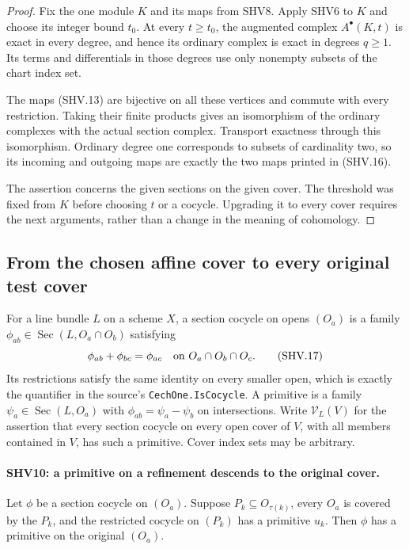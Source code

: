 \begin{proof}
Fix the one module $K$ and its maps from SHV8.  Apply SHV6 to
$K$ and choose its integer bound $t_0$.  At every $t\ge t_0$,
the augmented complex $A^\bullet(K,t)$ is exact in every
degree, and hence its ordinary complex is exact in degrees
$q\ge1$.  Its terms and differentials in those degrees use
only nonempty subsets of the chart index set.

The maps (SHV.13) are bijective on all these vertices and
commute with every restriction.  Taking their finite products
gives an isomorphism of the ordinary complexes with the
actual section complex.  Transport exactness through this
isomorphism.  Ordinary degree one corresponds to subsets of
cardinality two, so its incoming and outgoing maps are exactly
the two maps printed in (SHV.16).

The assertion concerns the given sections on the given cover.
The threshold was fixed from $K$ before choosing $t$ or a
cocycle.  Upgrading it to every cover requires the next
arguments, rather than a change in the meaning of cohomology.
\end{proof}

\subsection{From the chosen affine cover to every original test cover}

For a line bundle $L$ on a scheme $X$, a section cocycle on opens
$(O_a)$ is a family
$\phi_{ab}\in\operatorname{Sec}(L,O_a\cap O_b)$ satisfying
\[
                   \phi_{ab}+\phi_{bc}=\phi_{ac}
                   \quad\hbox{on }O_a\cap O_b\cap O_c.
                                                        \tag{SHV.17}
\]
Its restrictions satisfy the same identity on every smaller open,
which is exactly the quantifier in the source's
\texttt{CechOne.IsCocycle}.  A primitive is a family
$\psi_a\in\operatorname{Sec}(L,O_a)$ with
$\phi_{ab}=\psi_a-\psi_b$ on intersections.
Write $\mathcal V_L(V)$ for the assertion that every section cocycle
on every open cover of $V$, with all members contained in $V$,
has such a primitive.  Cover index sets may be arbitrary.

\paragraph{SHV10: a primitive on a refinement descends to the original cover.}
\label{claim:SHV10}
Let $\phi$ be a section cocycle on $(O_a)$.  Suppose
$P_k\subseteq O_{\tau(k)}$, every $O_a$ is covered by the
$P_k$, and the restricted cocycle on $(P_k)$ has a primitive
$u_k$.  Then $\phi$ has a primitive on the original $(O_a)$.


